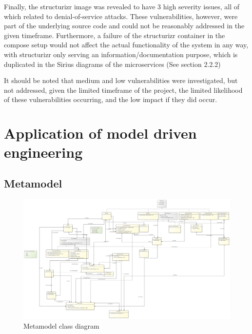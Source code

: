 \documentclass[parskip=full]{article}
\begin{document}
Finally, the structurizr image was revealed to have 3 high severity issues, all of which related to denial-of-service attacks.
These vulnerabilities, however, were part of the underlying source code and could not be reasonably addressed in the given timeframe.
Furthermore, a failure of the structurizr container in the compose setup would not affect the actual functionality of the system in any way, with structurizr only serving an information/documentation purpose, which is duplicated in the Sirius diagrams of the microservices (See section 2.2.2)

It should be noted that medium and low vulnerabilities were investigated, but not addressed, given the limited timeframe of the project, the limited likelihood of these vulnerabilities occurring, and the low impact if they did occur.


    \section{Application of model driven engineering}
    \subsection{Metamodel}
    \begin{figure}[h]
        \includegraphics[width=\textwidth]{metamodel-class-diagram}
        \caption{Metamodel class diagram}
        \label{fig:metamodelDiagram}
    \end{figure}
\end{document}
